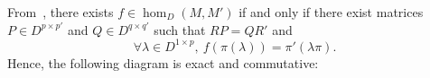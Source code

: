 \documentclass{ifacconf}
\begin{document}
From~\cite{Ro:09}, there exists $f\in\hom_D(M,M')$ if and only if there
exist matrices $P\in D^{p\times p'}$ and $Q\in D^{q\times q'}$ such that
$RP=QR'$ and
\medskip
\[\forall\lambda\in D^{1\times p},\ f(\pi(\lambda))=\pi'(\lambda\pi).\]
\medskip
Hence, the following diagram is exact and commutative:
\medskip
\begin{center}
  \begin{small}
  \end{small}
\end{center}
\medskip
\end{document}
